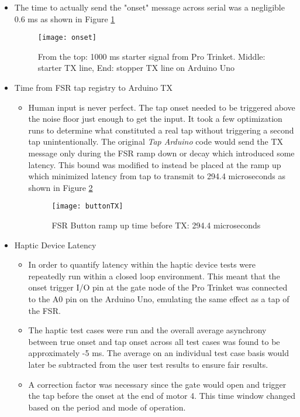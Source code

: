 \begin{itemize}
\begin{itemize}
\begin{itemize}
        \end{itemize}
    \end{itemize}
    \item The time to actually send the "onset" message across serial was a negligible 0.6 ms as shown in Figure \ref{fig:onsetMessage}
    \begin{figure}[H] \label{fig:onsetMessage}
        \centering
        \texttt{[image: onset]}
        \caption{From the top: 1000 ms starter signal from Pro Trinket. Middle: starter TX line, End: stopper TX line on Arduino Uno}
    \end{figure}
    \item Time from FSR tap registry to Arduino TX \label{FSRregistry}
    \begin{itemize}
        \item Human input is never perfect. The tap onset needed to be triggered above the noise floor just enough to get the input. It took a few optimization runs to determine what constituted a real tap without triggering a second tap unintentionally. The original \textit{Tap Arduino} code would send the TX message only during the FSR ramp down or decay which introduced some latency. This bound was modified to instead be placed at the ramp up which minimized latency from tap to transmit to 294.4 microseconds as shown in Figure \ref{buttonTX}
        \begin{figure}[H]\label{buttonTX}
            \centering
            \texttt{[image: buttonTX]}
            \caption{FSR Button ramp up time before TX: 294.4 microseconds}
        \end{figure}
    \end{itemize}
    \item Haptic Device Latency
    \begin{itemize}
        \item In order to quantify latency within the haptic device tests were repeatedly run within a closed loop environment. This meant that the onset trigger I/O pin at the gate node of the Pro Trinket was connected to the A0 pin on the Arduino Uno, emulating the same effect as a tap of the FSR.
        \item The haptic test cases were run and the overall average asynchrony between true onset and tap onset across all test cases was found to be approximately -5 ms. The average on an individual test case basis would later be subtracted from the user test results to ensure fair results.
        \item A correction factor was necessary since the gate would open and trigger the tap before the onset at the end of motor 4. This time window changed based on the period and mode of operation.

\end{itemize}
\end{itemize}
